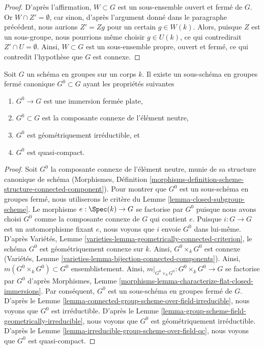 \begin{proof}
\medskip\noindent
D'après l'affirmation, $W \subset G$ est un sous-ensemble ouvert et fermé de $G$.
Or $W \cap Z' = \emptyset$, car sinon, d'après l'argument donné dans
le paragraphe précédent, nous aurions $Z' = Zg$ pour un certain $g \in W(k)$.
Alors, puisque $Z$ est un sous-groupe, nous pourrions même choisir $g \in U(k)$, ce qui
contredirait $Z' \cap U = \emptyset$. Ainsi, $W \subset G$ est un sous-ensemble propre, ouvert
et fermé, ce qui contredit l'hypothèse que $G$ est connexe.
\end{proof}

\begin{proposition}
\label{proposition-connected-component}
Soit $G$ un schéma en groupes sur un corps $k$. Il existe un sous-schéma
en groupes fermé canonique $G^0 \subset G$ ayant les propriétés suivantes
\begin{enumerate}
\item $G^0 \to G$ est une immersion fermée plate,
\item $G^0 \subset G$ est la composante connexe de l'élément neutre,
\item $G^0$ est géométriquement irréductible, et
\item $G^0$ est quasi-compact.
\end{enumerate}
\end{proposition}

\begin{proof}
Soit $G^0$ la composante connexe de l'élément neutre, munie de sa structure canonique
de schéma (Morphismes, Définition
\ref{morphisms-definition-scheme-structure-connected-component}).
Pour montrer que $G^0$ est un sous-schéma en groupes fermé, nous utiliserons le
critère du Lemme \ref{lemma-closed-subgroup-scheme}.
Le morphisme $e : \Spec(k) \to G$ se factorise par $G^0$ puisque nous avons choisi
$G^0$ comme la composante connexe de $G$ qui contient $e$.
Puisque $i : G \to G$ est un automorphisme fixant $e$, nous voyons que
$i$ envoie $G^0$ dans lui-même.
D'après Variétés, Lemme \ref{varieties-lemma-geometrically-connected-criterion},
le schéma $G^0$ est géométriquement connexe sur $k$.
Ainsi, $G^0 \times_k G^0$ est connexe
(Variétés, Lemme \ref{varieties-lemma-bijection-connected-components}).
Ainsi, $m(G^0 \times_k G^0) \subset G^0$ ensemblistement.
Ainsi, $m|_{G^0 \times_k G^0} : G^0 \times_k G^0 \to G$
se factorise par $G^0$ d'après
Morphismes, Lemme \ref{morphisms-lemma-characterize-flat-closed-immersions}.
Par conséquent, $G^0$ est un sous-schéma en groupes fermé de $G$.
D'après le Lemme \ref{lemma-connected-group-scheme-over-field-irreducible},
nous voyons que $G^0$ est irréductible. D'après
le Lemme \ref{lemma-group-scheme-field-geometrically-irreducible},
nous voyons que $G^0$ est géométriquement irréductible. D'après
le Lemme \ref{lemma-irreducible-group-scheme-over-field-qc},
nous voyons que $G^0$ est quasi-compact.
\end{proof}

